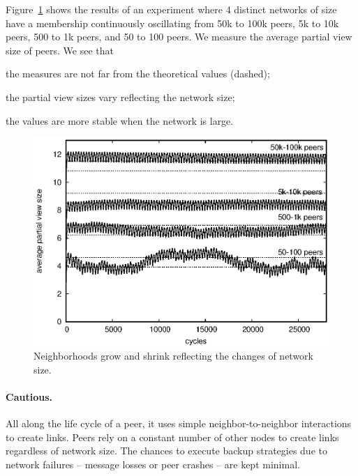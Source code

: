 Figure~\ref{fig:extended} shows the results of an experiment where 4 distinct
networks of size have a membership continuously oscillating from 50k to 100k peers, 5k
to 10k peers, 500 to 1k peers, and 50 to 100 peers. We measure the average
partial view size of peers. We see that
\begin{inparaenum}[(i)]
\item the measures are not far from the theoretical values (dashed);
\item the partial view sizes vary reflecting the network size;
\item the values are more stable when the network is large.
\end{inparaenum}




\begin{figure}
  \begin{center}
    \includegraphics[width=\SCALE\textwidth]{./img/extended.eps}
    \caption{\label{fig:extended} Neighborhoods grow and shrink reflecting the
      changes of network size.}
  \end{center}
\end{figure}


\paragraph{Cautious.}
All along the life cycle of a peer, it uses simple neighbor-to-neighbor
interactions to create links.  Peers rely on a constant number of other nodes to
create links regardless of network size. The chances to execute backup
strategies due to network failures -- message losses or peer crashes -- are kept
minimal.

